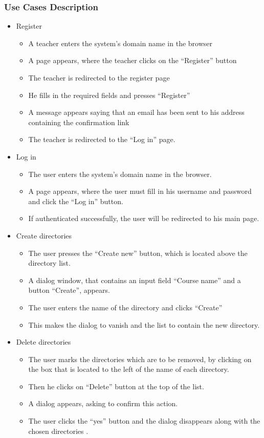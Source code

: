 \subsubsection{Use Cases Description}
\begin{itemize}
  \item Register
  \begin{itemize}
    \item A teacher enters the system’s domain name in the browser
    \item A page appears, where the teacher clicks on the “Register” button
    \item The teacher is redirected to the register page
    \item He fills in the required fields and presses “Register”
    \item A message appears saying that an email has been sent to his address containing the confirmation link
    \item The teacher is redirected to the “Log in” page.
  \end{itemize}

  \item Log in 
  \begin{itemize}
    \item The user enters the system’s domain name in the browser. 
    \item A page appears, where the user must fill in his username and password and click the “Log in” button. 
    \item If authenticated successfully, the user will be redirected to his main page.
  \end{itemize}

  \item Create directories
  \begin{itemize}
    \item The user presses the “Create new” button, which is located above the directory list.
    \item A dialog window, that contains an input field  “Course name” and a button “Create”, appears.
    \item The user enters the name of  the directory and clicks “Create”
    \item This makes the dialog to vanish and the list to contain the new directory.
  \end{itemize}

  \item Delete directories
  \begin{itemize}
    \item The user marks the directories which are to be removed, by clicking on the box that is located to the left of the name of each directory. 
    \item Then he clicks on “Delete” button at the top of the list.
    \item A dialog appears, asking to confirm this action.
    \item The user clicks the “yes” button and the dialog disappears along with the chosen directories .
  \end{itemize}


\end{itemize}
